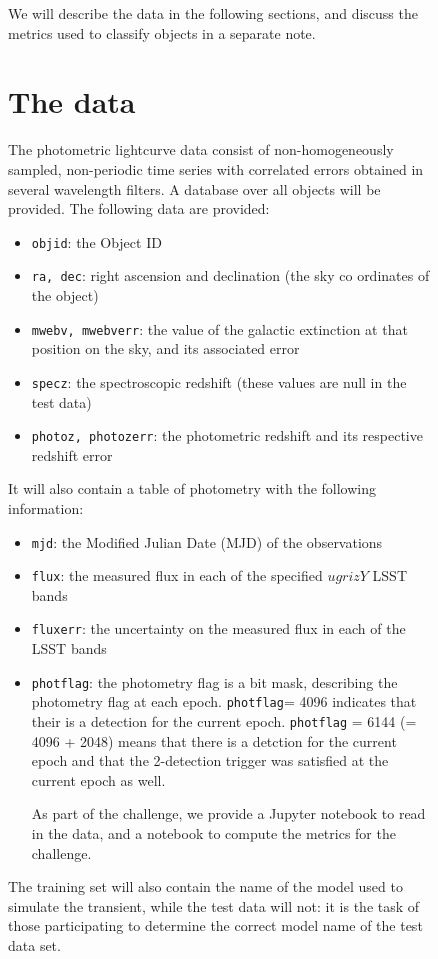 \documentclass[\docopts]{\docclass}
\begin{document}
\begin{figure}[htbp!]
We will describe the data in the following sections, and discuss the metrics used to classify objects in a separate note.
\section{The data}
\label{sec:thedata}

The photometric lightcurve data consist of non-homogeneously sampled, non-periodic time series with correlated errors obtained in several wavelength filters.
A database over all objects will be provided. The following data are provided:

\begin{itemize}
\item {\tt objid}: the Object ID
\item {\tt ra, dec}: right ascension and declination (the sky co ordinates of the object)
\item {\tt mwebv, mwebverr}: the value of the galactic extinction at that position on the sky, and its associated error
\item {\tt specz}: the spectroscopic redshift (these values are null in the test data)
\item {\tt photoz, photozerr}: the photometric redshift and its respective redshift error 
\end{itemize}

It will also contain a table of photometry with the following information:
\begin{itemize}
\item {\tt mjd}: the Modified Julian Date (MJD) of the observations
\item {\tt flux}: the measured flux in each of the specified $ugrizY$ LSST bands
\item {\tt fluxerr}: the uncertainty on the measured flux in each of the LSST bands
\item {\tt photflag}: the photometry flag is a bit mask, describing the photometry flag at each epoch. {\tt photflag}= 4096 indicates that their is a detection for the current epoch. {\tt photflag} = 6144 (= 4096 + 2048) means that there is a detction for the current epoch and that the 2-detection trigger was satisfied at the current epoch as well.

\clearpage
As part of the challenge, we provide a Jupyter notebook to read in the data, and a notebook to compute the metrics for the challenge.
\end{itemize}

The training set will also contain the name of the model used to simulate the transient, while the test data will not: it is the task of those participating to determine the correct model name of the test data set.



\end{figure}
\end{document}
